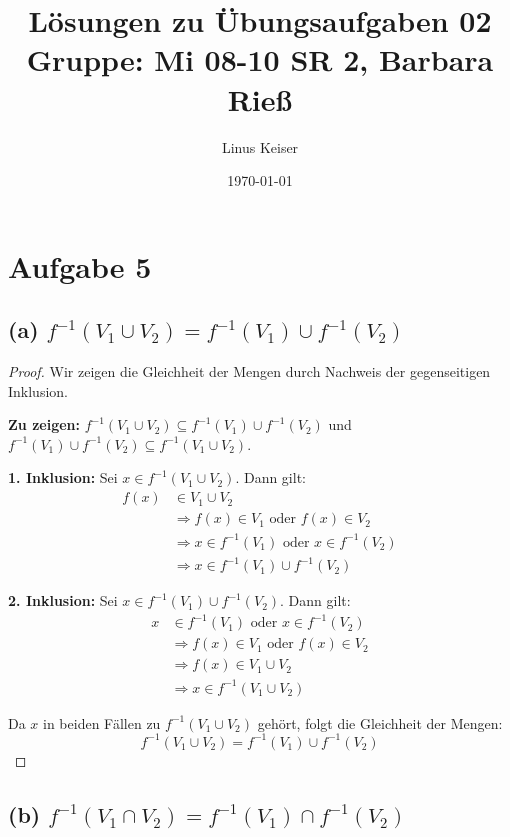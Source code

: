 \documentclass[12pt]{article}
\title{Lösungen zu Übungsaufgaben 02 \\ \small Gruppe: Mi 08-10 SR 2, Barbara Rieß}
\author{Linus Keiser}
\date{\today}
\begin{document}
\maketitle

\section*{Aufgabe 5}

\subsection*{(a) \( f^{-1}(V_1 \cup V_2) = f^{-1}(V_1) \cup f^{-1}(V_2) \)}

\begin{proof}
	Wir zeigen die Gleichheit der Mengen durch Nachweis der gegenseitigen Inklusion.

	\textbf{Zu zeigen:} \( f^{-1}(V_1 \cup V_2) \subseteq f^{-1}(V_1) \cup f^{-1}(V_2) \) und \( f^{-1}(V_1) \cup f^{-1}(V_2) \subseteq f^{-1}(V_1 \cup V_2) \).

	\textbf{1. Inklusion:} Sei \( x \in f^{-1}(V_1 \cup V_2) \). Dann gilt:
	\begin{align*}
		f(x) & \in V_1 \cup V_2                                              \\
		     & \Rightarrow f(x) \in V_1 \text{ oder } f(x) \in V_2           \\
		     & \Rightarrow x \in f^{-1}(V_1) \text{ oder } x \in f^{-1}(V_2) \\
		     & \Rightarrow x \in f^{-1}(V_1) \cup f^{-1}(V_2)
	\end{align*}

	\textbf{2. Inklusion:} Sei \( x \in f^{-1}(V_1) \cup f^{-1}(V_2) \). Dann gilt:
	\begin{align*}
		x & \in f^{-1}(V_1) \text{ oder } x \in f^{-1}(V_2)     \\
		  & \Rightarrow f(x) \in V_1 \text{ oder } f(x) \in V_2 \\
		  & \Rightarrow f(x) \in V_1 \cup V_2                   \\
		  & \Rightarrow x \in f^{-1}(V_1 \cup V_2)
	\end{align*}

	Da \( x \) in beiden Fällen zu \( f^{-1}(V_1 \cup V_2) \) gehört, folgt die Gleichheit der Mengen:
	\[ f^{-1}(V_1 \cup V_2) = f^{-1}(V_1) \cup f^{-1}(V_2) \]
\end{proof}

\subsection*{(b) \( f^{-1}(V_1 \cap V_2) = f^{-1}(V_1) \cap f^{-1}(V_2) \)}
\end{document}
